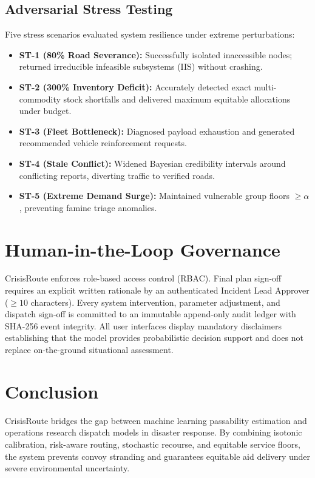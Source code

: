 \documentclass[11pt,a4paper]{article}
\begin{document}
\subsection{Adversarial Stress Testing}
Five stress scenarios evaluated system resilience under extreme perturbations:
\begin{itemize}
    \item \textbf{ST-1 (80\% Road Severance):} Successfully isolated inaccessible nodes; returned irreducible infeasible subsystems (IIS) without crashing.
    \item \textbf{ST-2 (300\% Inventory Deficit):} Accurately detected exact multi-commodity stock shortfalls and delivered maximum equitable allocations under budget.
    \item \textbf{ST-3 (Fleet Bottleneck):} Diagnosed payload exhaustion and generated recommended vehicle reinforcement requests.
    \item \textbf{ST-4 (Stale Conflict):} Widened Bayesian credibility intervals around conflicting reports, diverting traffic to verified roads.
    \item \textbf{ST-5 (Extreme Demand Surge):} Maintained vulnerable group floors $\ge \alpha$, preventing famine triage anomalies.
\end{itemize}

\section{Human-in-the-Loop Governance}
CrisisRoute enforces role-based access control (RBAC). Final plan sign-off requires an explicit written rationale by an authenticated Incident Lead Approver ($\ge 10$ characters). Every system intervention, parameter adjustment, and dispatch sign-off is committed to an immutable append-only audit ledger with SHA-256 event integrity. All user interfaces display mandatory disclaimers establishing that the model provides probabilistic decision support and does not replace on-the-ground situational assessment.

\section{Conclusion}
CrisisRoute bridges the gap between machine learning passability estimation and operations research dispatch models in disaster response. By combining isotonic calibration, risk-aware routing, stochastic recourse, and equitable service floors, the system prevents convoy stranding and guarantees equitable aid delivery under severe environmental uncertainty.
\end{document}
